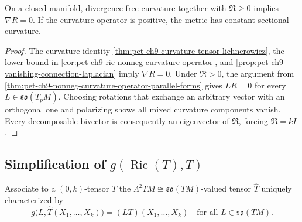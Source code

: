 \begin{theorem}
  \label{thm:pet-ch9-tachibana-parallel-curvature}
  On a closed manifold, divergence-free curvature together with
  $\mathfrak R\ge0$ implies $\nabla R=0$.  If the curvature operator is
  positive, the metric has constant sectional curvature.
\end{theorem}
\begin{proof}
  \sketch
  The curvature identity \cref{thm:pet-ch9-curvature-tensor-lichnerowicz}, the
  lower bound in \cref{cor:pet-ch9-ric-nonneg-curvature-operator}, and
  \cref{prop:pet-ch9-vanishing-connection-laplacian} imply \(\nabla R=0\).
  Under \(\mathfrak R>0\), the argument from
  \cref{thm:pet-ch9-nonneg-curvature-operator-parallel-forms} gives
  \(LR=0\) for every \(L\in\mathfrak{so}(T_pM)\).  Choosing rotations that
  exchange an arbitrary vector with an orthogonal one and polarizing shows
  all mixed curvature components vanish.  Every decomposable bivector is
  consequently an eigenvector of \(\mathfrak R\), forcing
  \(\mathfrak R=kI\).
\end{proof}

\subsection{Simplification of $g(\operatorname{Ric}(T),T)$}

\begin{definition}
  \label{def:pet-ch9-tensor-lambda2-valued}
  Associate to a $(0,k)$-tensor $T$ the
  $\Lambda^2TM\cong\mathfrak{so}(TM)$-valued tensor $\hat T$ uniquely
  characterized by
  \[
    g\big(L,\hat T(X_1,\dots,X_k)\big)=(LT)(X_1,\dots,X_k)\quad\text{for all }
    L\in\mathfrak{so}(TM).
  \]
\end{definition}

